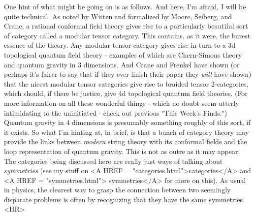 One hint of what might be going on is as follows.
And here, I'm afraid, I will be quite technical.  As noted by Witten and
formalized by Moore, Seiberg, and Crane, a rational conformal field
theory gives rise to a particularly beautiful sort of category called a
modular tensor category.  This contains, as it were, the barest essence
of the theory.  Any modular tensor category gives rise in turn to a 3d
topological quantum field theory - examples of which are Chern-Simons
theory and quantum gravity in 3 dimensions.  And Crane and Frenkel have
shown (or perhaps it's fairer to say that if they ever finish their
paper they \emph{will} have shown) that the nicest modular tensor categories
give rise to braided tensor 2-categories, which should, if there be
justice, give 4d topological quantum field theories.  (For more
information on all these wonderful things - which no doubt seem utterly
intimidating to the uninitiated - check out previous "This Week's
Finds.")  Quantum gravity in 4 dimensions is presumably something
roughly of this sort, if it exists.  So what I'm hinting at, in brief,
is that a bunch of category theory may provide the links between
\emph{modern} string theory with its conformal fields and the loop
representation of quantum gravity.  This is not as outre as it may
appear.  The categories being discussed here are really just ways of
talking about \emph{symmetries} (see my stuff on <A HREF = 
"categories.html">categories</A> and <A HREF = "symmetries.html">
symmetries</A> for more on this).  As usual in physics, the clearest 
way to grasp the connection between two seemingly disparate problems is 
often by recognizing that they have the same symmetries.
<HR>



